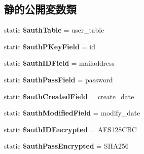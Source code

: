 \subsection*{静的公開変数類}
\begin{DoxyCompactItemize}
\item 
\hypertarget{class_auth_a03a809bbbfc02f20d510efa62f63ba5c}{}static {\bfseries \$auth\+Table} = \textquotesingle{}user\+\_\+table\textquotesingle{}\label{class_auth_a03a809bbbfc02f20d510efa62f63ba5c}

\item 
\hypertarget{class_auth_a5b7fb197d46cae1d222e6507a28f8273}{}static {\bfseries \$auth\+P\+Key\+Field} = \textquotesingle{}id\textquotesingle{}\label{class_auth_a5b7fb197d46cae1d222e6507a28f8273}

\item 
\hypertarget{class_auth_a1a1e9c62415af1e3be9d2e553cdbad25}{}static {\bfseries \$auth\+I\+D\+Field} = \textquotesingle{}mailaddress\textquotesingle{}\label{class_auth_a1a1e9c62415af1e3be9d2e553cdbad25}

\item 
\hypertarget{class_auth_ab253bd6a9a2bc5b8506a70aee6d66966}{}static {\bfseries \$auth\+Pass\+Field} = \textquotesingle{}password\textquotesingle{}\label{class_auth_ab253bd6a9a2bc5b8506a70aee6d66966}

\item 
\hypertarget{class_auth_af3a21942b3b0e75ff8f3aef25f4ba4ea}{}static {\bfseries \$auth\+Created\+Field} = \textquotesingle{}create\+\_\+date\textquotesingle{}\label{class_auth_af3a21942b3b0e75ff8f3aef25f4ba4ea}

\item 
\hypertarget{class_auth_aec98f90d8d9b9249e867bc37982b3b17}{}static {\bfseries \$auth\+Modified\+Field} = \textquotesingle{}modify\+\_\+date\textquotesingle{}\label{class_auth_aec98f90d8d9b9249e867bc37982b3b17}

\item 
\hypertarget{class_auth_aeb9548ba124de21158de2d51eae93221}{}static {\bfseries \$auth\+I\+D\+Encrypted} = \textquotesingle{}A\+E\+S128\+C\+B\+C\textquotesingle{}\label{class_auth_aeb9548ba124de21158de2d51eae93221}

\item 
\hypertarget{class_auth_a585e0969b2397e80a1bba246a1aee2a1}{}static {\bfseries \$auth\+Pass\+Encrypted} = \textquotesingle{}S\+H\+A256\textquotesingle{}\label{class_auth_a585e0969b2397e80a1bba246a1aee2a1}

\end{DoxyCompactItemize}
